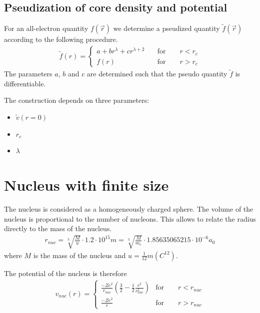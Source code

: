 \documentclass[11pt,a4paper]{report}
\begin{document}
\subsection{Pseudization of core density and potential}
For an all-electron quantity $f(\vec{r})$ we determine a pseudized
quantity $\tilde{f}(\vec{r})$ according to the following procedure.
\begin{eqnarray*}
\tilde{f}(r)=
\left\lbrace\begin{array}{ll}
a+br^\lambda+cr^{\lambda+2}&\quad\textrm{for}\qquad r<r_c\\
f(r)&\quad\textrm{for}\qquad r>r_c
\end{array}
\right.
\end{eqnarray*}
The parameters $a$, $b$ and $c$ are determined such that the pseudo
quantity $\tilde{f}$ is differentiable.

The construction depends on three parameters:
\begin{itemize}
\item $\tilde{v}(r=0)$
\item $r_c$
\item $\lambda$
\end{itemize}

\section{Nucleus with finite size}
\label{sec:finitesizenucleus}
The nucleus is considered as a homogeneously charged sphere. The
volume of the nucleus is proportional to the number of nucleons.  This
allows to relate the radius directly to the mass of the
nucleus.\cite{cooper53_pr92_801,hofstadter56_rmp28_214}
\begin{eqnarray*}
r_{nuc}=\sqrt[3]{\frac{M}{u}}\cdot1.2\cdot 10^{15} m 
=\sqrt[3]{\frac{M}{m_e}}\cdot1.85635065215\cdot 10^{-6}  a_0
\end{eqnarray*}
where $M$ is the mass of the nucleus and
$u=\frac{1}{12}m(C^{12})$. 

The potential of the nucleus is therefore
\begin{eqnarray*}
v_{nuc}(r)=
\left\lbrace
\begin{array}{cc}
\frac{-Ze^2}{r_{nuc}}\left(\frac{3}{2}-\frac{1}{2}\frac{r^2}{r_{nuc}^2}\right)
&\textrm{for}\qquad r<r_{nuc}\\
\frac{-Ze^2}{r}
&\textrm{for}\qquad r>r_{nuc}
\end{array}\right.
\end{eqnarray*}
\end{document}
